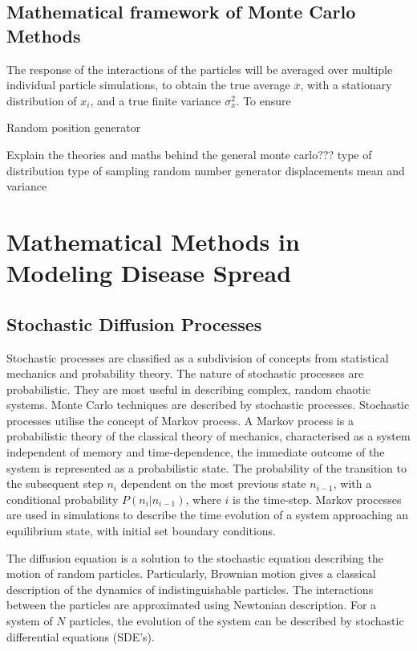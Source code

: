 \documentclass[11pt]{report}
\begin{document}
\subsection{Mathematical framework of Monte Carlo Methods}

 The response of the interactions of the particles will be averaged over multiple individual particle simulations, to obtain the true average $\overline{x}$, with a stationary distribution of $x_i$, and a true finite variance $\sigma_x^2$. To ensure 


Random position generator 

Explain the theories and maths behind the general monte carlo??? 
type of distribution 
type of sampling 
random number generator 
displacements 
mean and variance 


\section{Mathematical Methods in Modeling Disease Spread}



\subsection{Stochastic Diffusion Processes}

Stochastic processes are classified as a subdivision of concepts from statistical mechanics and probability theory. The nature of stochastic processes are probabilistic. They are most useful in describing complex, random chaotic systems. Monte Carlo techniques are described by stochastic processes. Stochastic processes utilise the concept of Markov process. A Markov process is a probabilistic theory of the classical theory of mechanics, characterised as a system independent of memory and time-dependence, the immediate outcome of the system is represented as a probabilistic state. The probability of the transition to the subsequent step $n_i$ dependent on the most previous state $n_{i-1}$, with a conditional probability $P(n_i|n_{i-1})$, where $i$ is the time-step. Markov processes are used in simulations to describe the time evolution of a system approaching an equilibrium state, with initial set boundary conditions.

The diffusion equation is a solution to the stochastic equation describing the motion of random particles. Particularly, Brownian motion gives a classical description of the dynamics of indistinguishable particles. The interactions between the particles are approximated using Newtonian description. For a system of $N$ particles, the evolution of the system can be described by stochastic differential equations (SDE's).
\end{document}
